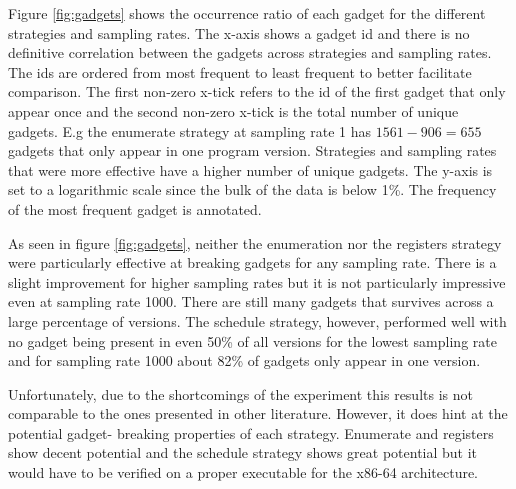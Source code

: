 Figure \ref{fig:gadgets} shows the occurrence ratio of each gadget for the different
strategies and sampling rates. The x-axis shows a gadget id and there is no definitive
correlation between the gadgets across strategies and sampling rates. The ids are ordered
from most frequent to least frequent to better facilitate comparison. The first non-zero
x-tick refers to the id of the first gadget that only appear once and the second non-zero
x-tick is the total number of unique gadgets. E.g the enumerate strategy at sampling rate
1 has $1561-906=655$ gadgets that only appear in one program version. Strategies and
sampling rates that were more effective have a higher number of unique gadgets. The y-axis
is set to a logarithmic scale since the bulk of the data is below 1\%. The frequency of
the most frequent gadget is annotated.


As seen in figure \ref{fig:gadgets}, neither the enumeration nor the registers strategy
were particularly effective at breaking gadgets for any sampling rate. There is a slight
improvement for higher sampling rates but it is not particularly impressive even at
sampling rate 1000. There are still many gadgets that survives across a large percentage of
versions. The schedule strategy, however, performed well with no gadget being present
in even 50\% of all versions for the lowest sampling rate and for sampling rate 1000
about 82\% of gadgets only appear in one version.

Unfortunately, due to the shortcomings of the experiment this results is not comparable to
the ones presented in other literature. However, it does hint at the potential gadget-
breaking properties of each strategy. Enumerate and registers show decent potential and the
schedule strategy shows great potential but it would have to be verified on a proper
executable for the x86-64 architecture.
